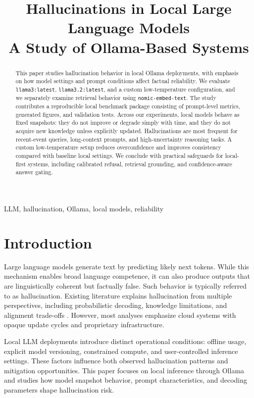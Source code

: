 \documentclass[conference]{IEEEtran}
\title{Hallucinations in Local Large Language Models\\
\large A Study of Ollama-Based Systems}
\author{\IEEEauthorblockN{Punyaa Dixit}
\IEEEauthorblockA{Department of Computer Science\\
Email: punyaa184@gmail.com}}
\begin{document}
\maketitle

\begin{abstract}
This paper studies hallucination behavior in local Ollama deployments, with emphasis on how model settings and prompt conditions affect factual reliability. We evaluate \texttt{llama3:latest}, \texttt{llama3.2:latest}, and a custom low-temperature configuration, and we separately examine retrieval behavior using \texttt{nomic-embed-text}. The study contributes a reproducible local benchmark package consisting of prompt-level metrics, generated figures, and validation tests. Across our experiments, local models behave as fixed snapshots: they do not improve or degrade simply with time, and they do not acquire new knowledge unless explicitly updated. Hallucinations are most frequent for recent-event queries, long-context prompts, and high-uncertainty reasoning tasks. A custom low-temperature setup reduces overconfidence and improves consistency compared with baseline local settings. We conclude with practical safeguards for local-first systems, including calibrated refusal, retrieval grounding, and confidence-aware answer gating.
\end{abstract}

\begin{IEEEkeywords}
LLM, hallucination, Ollama, local models, reliability
\end{IEEEkeywords}

\section{Introduction}
Large language models generate text by predicting likely next tokens. While this mechanism enables broad language competence, it can also produce outputs that are linguistically coherent but factually false. Such behavior is typically referred to as hallucination. Existing literature explains hallucination from multiple perspectives, including probabilistic decoding, knowledge limitations, and alignment trade-offs \cite{b1,b2,b3}. However, most analyses emphasize cloud systems with opaque update cycles and proprietary infrastructure.

Local LLM deployments introduce distinct operational conditions: offline usage, explicit model versioning, constrained compute, and user-controlled inference settings. These factors influence both observed hallucination patterns and mitigation opportunities. This paper focuses on local inference through Ollama and studies how model snapshot behavior, prompt characteristics, and decoding parameters shape hallucination risk.
\end{document}
